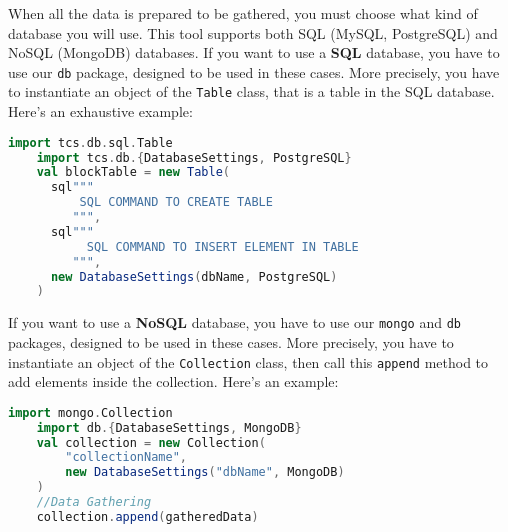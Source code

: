 When all the data is prepared to be gathered, you must choose what kind of database you will use. This tool supports both SQL (MySQL, PostgreSQL) and NoSQL (MongoDB) databases.
If you want to use a \textbf{SQL} database, you have to use our \texttt{db} package, designed to be used in these cases. More precisely, you have to instantiate an object of the \texttt{Table} class, that is a table in the SQL database. 
\newline
Here's an exhaustive example:
\begin{lstlisting}[language=Scala]
    import tcs.db.sql.Table
    import tcs.db.{DatabaseSettings, PostgreSQL}
    val blockTable = new Table(
      sql"""
          SQL COMMAND TO CREATE TABLE
         """,
      sql"""
           SQL COMMAND TO INSERT ELEMENT IN TABLE
         """,
      new DatabaseSettings(dbName, PostgreSQL)
    )
\end{lstlisting}
If you want to use a \textbf{NoSQL} database, you have to use our \texttt{mongo} and \texttt{db} packages, designed to be used in these cases. More precisely, you have to instantiate an object of the \texttt{Collection} class, then call this \texttt{append} method to add elements inside the collection. 
\newline
Here's an example:
\begin{lstlisting}[language=Scala]
    import mongo.Collection
    import db.{DatabaseSettings, MongoDB}
    val collection = new Collection(
        "collectionName", 
        new DatabaseSettings("dbName", MongoDB)
    )
    //Data Gathering
    collection.append(gatheredData)
\end{lstlisting}

